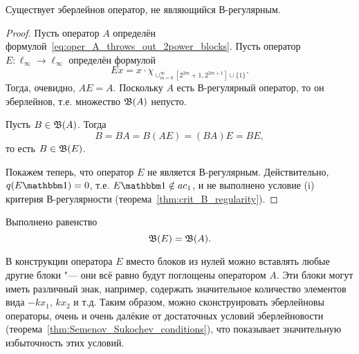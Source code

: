 \begin{theorem}
	\label{thm:Eberlein_but_not_B-regular_exists}
	Существует эберлейнов оператор, не являющийся В-регулярным.
\end{theorem}

\begin{proof}
	Пусть оператор $A$ определён формулой~\eqref{eq:oper_A_throws_out_2power_blocks}.
	Пусть оператор $E:\ell_\infty\to\ell_\infty$ определён формулой
	\begin{equation}
		Ex = x \cdot \chi_{\cup_{m=0}^{\infty}\left[2^{2 m}+1, 2^{2 m+1}\right] \cup\{1\}}
		.
	\end{equation}
	Тогда, очевидно, $AE=A$.
	Поскольку $A$ есть В-регулярный оператор, то он эберлейнов,
	т.е. множество $\mathfrak{B}(A)$ непусто.

	Пусть $B\in\mathfrak{B}(A)$. Тогда
	\begin{equation}
		B = BA = B(AE) = (BA)E = BE
		,
	\end{equation}
	то есть $B\in\mathfrak{B}(E)$.

	Покажем теперь, что оператор $E$ не является В-регулярным.
	Действительно, $q(E\one) =0$, т.е. $ E\one \notin ac_1$,
	и не выполнено условие (i) критерия В-регулярности (теорема~\ref{thm:crit_B_regularity}).
\end{proof}

\begin{hypothesis}
	Выполнено равенство
	\begin{equation}
		\mathfrak{B}(E) = \mathfrak{B}(A)
		.
	\end{equation}
\end{hypothesis}

\begin{remark}
	В конструкции оператора $E$ вместо блоков из нулей можно вставлять любые другие блоки "---
	они всё равно будут поглощены оператором $A$.
	Эти блоки могут иметь различный знак, например, содержать значительное количество
	элементов вида $-kx_1$, $kx_2$ и т.д.
	Таким образом, можно сконструировать эберлейновы операторы, очень и очень далёкие
	от достаточных условий эберлейновости (теорема~\ref{thm:Semenov_Sukochev_conditions}),
	что показывает значительную избыточность этих условий.
\end{remark}
